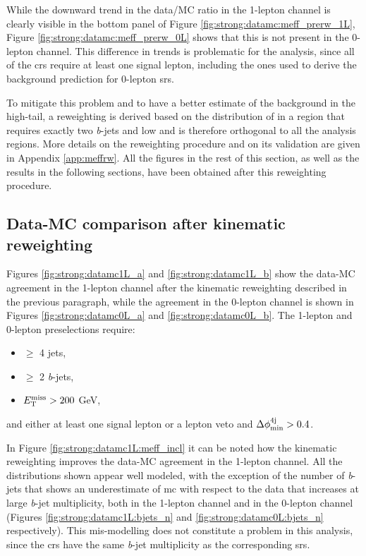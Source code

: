 While the downward trend in the data/MC ratio in the 1-lepton channel is clearly visible in the bottom panel of Figure \ref{fig:strong:datamc:meff_prerw_1L},
Figure \ref{fig:strong:datamc:meff_prerw_0L} shows that this is not present in the 0-lepton channel.
This difference in trends is problematic for the analysis, since all of the \glspl{cr} require at least one signal lepton, 
including the ones used to derive the background prediction for 0-lepton \glspl{sr}. 

To mitigate this problem and to have a better estimate of the background in the high-\meff tail, a reweighting is derived 
based on the distribution of \meff in a region that requires exactly two \textit{b}-jets and low \mtb and is therefore
 orthogonal to all the analysis regions. More details on the reweighting procedure and on its validation are given in Appendix \ref{app:meffrw}.
All the figures in the rest of this section, as well as the results in the following sections, 
have been obtained after this reweighting procedure.


\subsection{Data-MC comparison after kinematic reweighting}

Figures \ref{fig:strong:datamc1L_a} and \ref{fig:strong:datamc1L_b} show the data-MC agreement in the 1-lepton channel after the 
kinematic reweighting described in the previous paragraph, while 
the agreement in the 0-lepton channel is shown in Figures \ref{fig:strong:datamc0L_a} and \ref{fig:strong:datamc0L_b}.
The 1-lepton and 0-lepton preselections require:
\begin{itemize}
\item $\geq$ 4 jets,
\item $\geq$ 2 \textit{b}-jets,
\item $E_{\rm T}^{\mathrm{miss}} > 200$ GeV, 
\end{itemize}
and either at least one signal lepton or a lepton veto and $\Delta\phi_{\rm{min}}^{4{\rm{j}}} > 0.4$.

In Figure \ref{fig:strong:datamc1L:meff_incl} it can be noted how the kinematic reweighting improves the data-MC agreement in
the 1-lepton channel. 
All the distributions shown appear well modeled, with the exception of the number of \textit{b}-jets 
that shows an underestimate of \gls{mc} with respect to the data that increases at large \textit{b}-jet multiplicity, both in 
the 1-lepton channel and in the 0-lepton channel 
(Figures \ref{fig:strong:datamc1L:bjets_n} and \ref{fig:strong:datamc0L:bjets_n} respectively).
This mis-modelling does not constitute a problem in this analysis, 
since the \glspl{cr} have the same \textit{b}-jet multiplicity as the corresponding \glspl{sr}.



